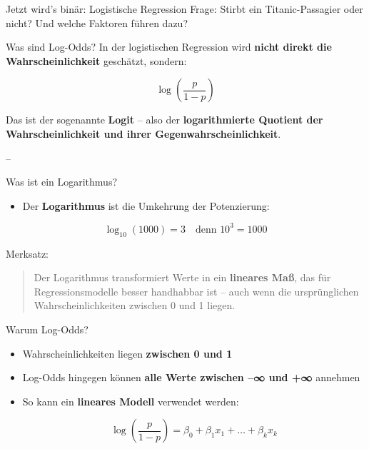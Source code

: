 \documentclass[
  ignorenonframetext,
]{beamer}
\providecommand{\tightlist}{%
  \setlength{\itemsep}{0pt}\setlength{\parskip}{0pt}}
\begin{document}
\begin{frame}{Jetzt wird's binär: Logistische Regression}
\protect{}\label{jetzt-wirds-binuxe4r-logistische-regression}
Frage: Stirbt ein Titanic-Passagier oder nicht? Und welche Faktoren
führen dazu?
\end{frame}

\begin{frame}{Was sind Log-Odds?}
\protect{}\label{was-sind-log-odds}
In der logistischen Regression wird \textbf{nicht direkt die
Wahrscheinlichkeit} geschätzt, sondern:

\[\log\left(\frac{p}{1 - p}\right)\]

Das ist der sogenannte \textbf{Logit} -- also der \textbf{logarithmierte
Quotient der Wahrscheinlichkeit und ihrer Gegenwahrscheinlichkeit}.

--
\end{frame}

\begin{frame}{Was ist ein Logarithmus?}
\protect{}\label{was-ist-ein-logarithmus}
\begin{itemize}
\tightlist
\item
  Der \textbf{Logarithmus} ist die Umkehrung der Potenzierung:
\end{itemize}

\[  \log_{10}(1000) = 3 \quad \text{denn } 10^3 = 1000\]
\end{frame}

\begin{frame}
\begin{block}{Merksatz:}
\protect{}\label{merksatz}
\begin{quote}
Der Logarithmus transformiert Werte in ein \textbf{lineares Maß}, das
für Regressionsmodelle besser handhabbar ist -- auch wenn die
ursprünglichen Wahrscheinlichkeiten zwischen 0 und 1 liegen.
\end{quote}
\end{block}
\end{frame}

\begin{frame}{Warum Log-Odds?}
\protect{}\label{warum-log-odds}
\begin{itemize}
\item
  Wahrscheinlichkeiten liegen \textbf{zwischen 0 und 1}
\item
  Log-Odds hingegen können \textbf{alle Werte zwischen --∞ und +∞}
  annehmen
\item
  So kann ein \textbf{lineares Modell} verwendet werden:

  \[\log\left(\frac{p}{1 - p}\right) = \beta_0 + \beta_1 x_1 + \dots + \beta_k x_k \]
\end{itemize}
\end{frame}
\end{document}
